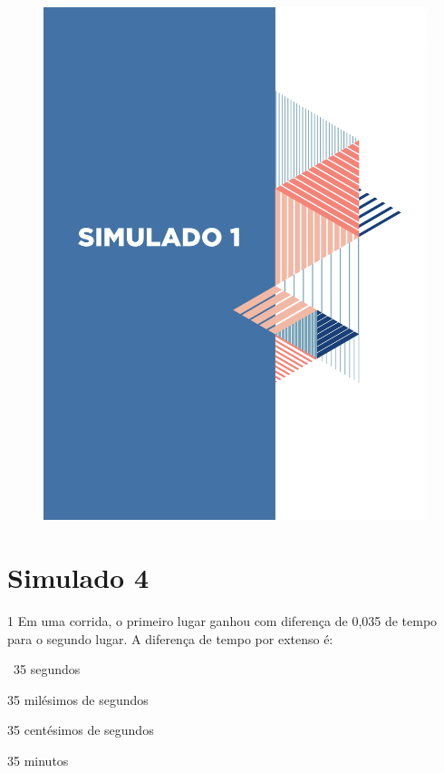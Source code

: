 \begin{figure}
\vspace*{-3cm}
\hspace*{-3.7cm}\includegraphics[scale=1]{../watermarks/1simulado9ano.pdf}
\end{figure}


\pagebreak

\section*{Simulado 4}

\num{1} Em uma corrida, o primeiro lugar ganhou com diferença de 0,035 de
tempo para o segundo lugar. A diferença de tempo por extenso é:

\begin{escolha}
\item~35 segundos
\item 35 milésimos de segundos
\item 35 centésimos de segundos
\item 35 minutos
\end{escolha}

